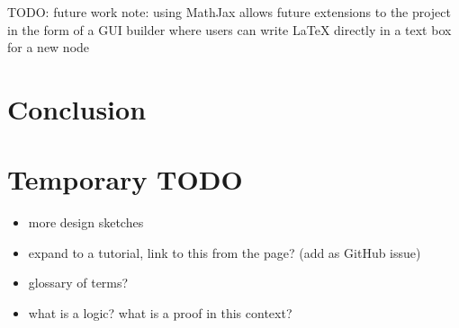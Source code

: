 \documentclass[conference]{IEEEtran}
\begin{document}
TODO: future work note: using MathJax allows future extensions to the project in the form of a GUI builder where users can write LaTeX directly in a text box for a new node \\

\section{Conclusion}
\label{sec:conclusion}



\section{Temporary TODO}

\begin{itemize}
\item more design sketches
\item expand to a tutorial, link to this from the page? (add as GitHub issue)
\item glossary of terms?
\item what is a logic? what is a proof in this context?
\end{itemize}



\end{document}
